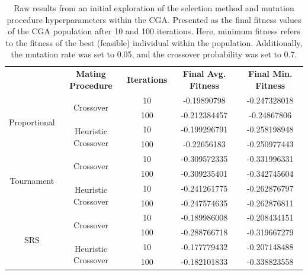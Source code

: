 \documentclass[10pt]{article}
\begin{document}
\begin{table}[H]
    \centering
    \begin{tabular}{|*{5}{c|}}
        \hline
        \renewcommand{\arraystretch}{1.5}
        \multirow{2}{*}{\textbf{Selection Method}} & \multirow{2}{*}{\textbf{Mating Procedure}} & \multirow{2}{*}{\textbf{Iterations}} & \multirow{2}{*}{\textbf{Final Avg. Fitness}} & \multirow{2}{*}{\textbf{Final Min. Fitness}} \\
        & & & & \\
        \hline
        \multirow{4}{*}{Proportional} & \multirow{2}{*}{Crossover} & 10 & -0.19890798 & -0.247328018 \\
        & &\cellcolor{lightgray} 100 &\cellcolor{lightgray} -0.212384457 &\cellcolor{lightgray} -0.24867806 \\
        \cline{2-5}
        & \multirow{2}{*}{Heuristic Crossover} & 10 & -0.199296791 & -0.258198948 \\
        & &\cellcolor{lightgray} 100 &\cellcolor{lightgray} -0.22656183 & \cellcolor{lightgray} -0.250977443 \\
        \hline
        \multirow{4}{*}{Tournament} & \multirow{2}{*}{Crossover} & 10 & -0.309572335 & -0.331996331 \\
        & &\cellcolor{lightgray} 100 &\cellcolor{lightgray} -0.309235401 &\cellcolor{lightgray} -0.342745604 \\
        \cline{2-5}
        & \multirow{2}{*}{Heuristic Crossover} & 10 & -0.241261775 & -0.262876797 \\
        & &\cellcolor{lightgray} 100 &\cellcolor{lightgray} -0.247574635 &\cellcolor{lightgray} -0.262876811 \\
        \hline
        \multirow{4}{*}{SRS} & \multirow{2}{*}{Crossover} & 10 & -0.189986008 & -0.208434151 \\
        & &\cellcolor{lightgray} 100 &\cellcolor{lightgray} -0.288766718 &\cellcolor{lightgray} -0.319667279 \\
        \cline{2-5}
        & \multirow{2}{*}{Heuristic Crossover} & 10 & -0.177779432 & -0.207148488 \\
        & &\cellcolor{lightgray} 100 &\cellcolor{lightgray} -0.182101833 &\cellcolor{lightgray} -0.338823558 \\
        \hline
    \end{tabular}
    \captionsetup{justification=centering}
    \caption{Raw results from an initial exploration of the selection method and mutation procedure hyperparameters within the CGA. Presented as the final fitness values of the CGA population after 10 and 100 iterations. Here, minimum fitness refers to the fitness of the best (feasible) individual within the population. Additionally, the mutation rate was set to 0.05, and the crossover probability was set to 0.7.}
    \label{tab:CGAexploration}
\end{table}
\end{document}
